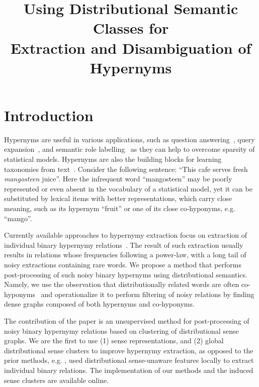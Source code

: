 \documentclass[10pt, a4paper]{article}
\title{\textbf{Using Distributional Semantic Classes for \\ Extraction and Disambiguation of Hypernyms}}
\begin{document}
\maketitleabstract

\section{Introduction}

Hypernyms are useful in various applications, such as question answering~\cite{Zhou:13}, query expansion~\cite{gong2005web},  and semantic role labelling~\cite{shi2005putting} as they can help to overcome sparsity of statistical models. Hypernyms are also the building blocks for learning taxonomies from text~\cite{bordea2016semeval}. Consider the following sentence: ``This cafe serves fresh \textit{mangosteen} juice''. Here the infrequent word ``mangosteen'' may be poorly represented or even absent in the vocabulary of a statistical model, yet it can be substituted by lexical items with better representations, which carry close meaning, such as its hypernym ``fruit'' or one of its close co-hyponyms, e.g. ``mango''. 

Currently available approaches to hypernymy extraction focus on extraction of individual binary hypernymy relations~\cite{hearst1992automatic,snow2004learning,weeds2014learning,shwartz-goldberg-dagan:2016:P16-1}. The result of such extraction usually results in relations whose frequencies following a power-law, with a long tail of noisy extractions containing rare words. We propose a method that performs post-processing of such noisy binary hypernyms using distributional semantics. Namely, we use the observation that distributionally related words are often co-hyponyms~\cite{wandmacher2005semantic,Heylen:08} and operationalize it to perform filtering of noisy relations by finding dense graphs composed of both hypernyms and co-hyponyms.  
 
The contribution of the paper is an unsupervised method for post-processing of noisy binary hypernymy relations based on clustering of distributional sense graphs. We are the first to use (1) sense representations, and (2) global distributional sense clusters to improve hypernymy extraction, as opposed to the prior methods, e.g. \cite{shwartz-goldberg-dagan:2016:P16-1}, used distributional sense-unaware features locally to extract individual binary relations.
The implementation of our methods and the induced sense clusters are available online.%
\end{document}
